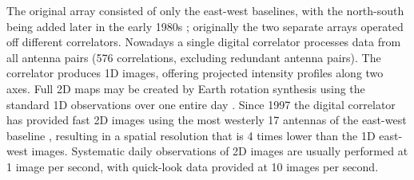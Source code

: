 The original array consisted of only the east-west baselines, with the north-south being added later in the early 1980s \citep{bonmartin1983}; originally the two separate arrays operated off different correlators. Nowadays a single digital correlator processes data from all antenna pairs (576 correlations, excluding redundant antenna pairs). The correlator produces 1D images, offering projected intensity profiles along two axes. Full 2D maps may be created by Earth rotation synthesis using the standard 1D observations over one entire day \citep{nrh1993}. Since 1997 the digital correlator has provided fast 2D images using the most westerly 17 antennas of the east-west baseline \citep{kerdraon1997}, resulting in a spatial resolution that is 4 times lower than the 1D east-west images. Systematic daily observations of 2D images are usually performed at  1 image per second, with quick-look data provided at 10 images per second.

